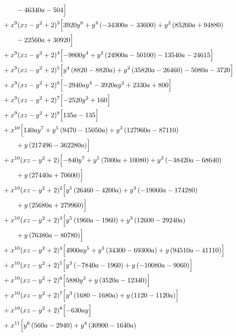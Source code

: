 \begin{align*}
&\qquad - 46340 a - 504\Bigr]\\
&{}+x^{9}(xz-y^2+2)^{3}\Bigl[3920 y^{6} + y^{4} \left(- 34300 a - 33600\right) + y^{2} \left(85260 a + 94880\right)\\
&\qquad - 22560 a + 30920\Bigr]\\
&{}+x^{9}(xz-y^2+2)^{4}\Bigl[- 9800 y^{4} + y^{2} \left(24900 a - 50100\right) - 13540 a - 24615\Bigr]\\
&{}+x^{9}(xz-y^2+2)^{5}\Bigl[y^{4} \left(8820 - 8820 a\right) + y^{2} \left(35820 a - 26460\right) - 5080 a - 3720\Bigr]\\
&{}+x^{9}(xz-y^2+2)^{6}\Bigl[- 2940 a y^{4} - 3920 a y^{2} + 2330 a + 800\Bigr]\\
&{}+x^{9}(xz-y^2+2)^{7}\Bigl[- 2520 y^{2} + 160\Bigr]\\
&{}+x^{9}(xz-y^2+2)^{8}\Bigl[135 a - 135\Bigr]\\
&{}+x^{10}\Bigl[140 a y^{7} + y^{5} \left(9470 - 15050 a\right) + y^{3} \left(127960 a - 87110\right)\\
&\qquad + y \left(217496 - 362280 a\right)\Bigr]\\
&{}+x^{10}(xz-y^2+2)\Bigl[- 840 y^{7} + y^{5} \left(7000 a + 10080\right) + y^{3} \left(- 38420 a - 68640\right)\\
&\qquad + y \left(27440 a + 70600\right)\Bigr]\\
&{}+x^{10}(xz-y^2+2)^{2}\Bigl[y^{5} \left(26460 - 4200 a\right) + y^{3} \left(- 19060 a - 174280\right)\\
&\qquad + y \left(25680 a + 279960\right)\Bigr]\\
&{}+x^{10}(xz-y^2+2)^{3}\Bigl[y^{5} \left(1960 a - 1960\right) + y^{3} \left(12600 - 29240 a\right)\\
&\qquad + y \left(76380 a - 80780\right)\Bigr]\\
&{}+x^{10}(xz-y^2+2)^{4}\Bigl[4900 a y^{5} + y^{3} \left(34300 - 69300 a\right) + y \left(94510 a - 41110\right)\Bigr]\\
&{}+x^{10}(xz-y^2+2)^{5}\Bigl[y^{3} \left(- 7840 a - 1960\right) + y \left(- 10080 a - 9060\right)\Bigr]\\
&{}+x^{10}(xz-y^2+2)^{6}\Bigl[5880 y^{3} + y \left(3520 a - 12340\right)\Bigr]\\
&{}+x^{10}(xz-y^2+2)^{7}\Bigl[y^{3} \left(1680 - 1680 a\right) + y \left(1120 - 1120 a\right)\Bigr]\\
&{}+x^{10}(xz-y^2+2)^{8}\Bigl[- 630 a y\Bigr]\\
&{}+x^{11}\Bigl[y^{6} \left(560 a - 2940\right) + y^{4} \left(30900 - 1640 a\right)\\

\end{align*}
